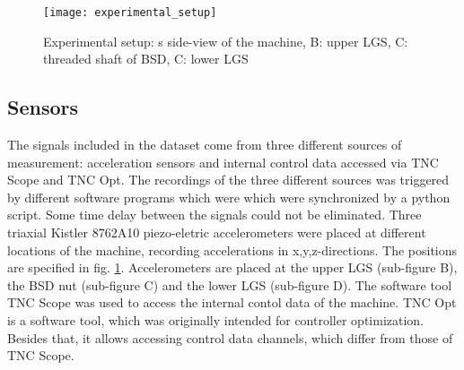 \begin{figure}[H]
  \centering
  \texttt{[image: experimental\_setup]}
  \caption {Experimental setup: s side-view of the machine, B: upper LGS, C: threaded shaft of BSD, C: lower LGS}
  \label{fig:experimental_setup}
\end{figure}

\subsection{Sensors}
The signals included in the dataset come from three different sources of measurement: acceleration sensors and internal control data accessed via TNC Scope and TNC Opt. The recordings of the three different sources was triggered by different software programs which were which were synchronized by a python script. Some time delay between the signals could not be eliminated. Three triaxial Kistler 8762A10 piezo-eletric accelerometers were placed at different locations of the machine, recording accelerations in x,y,z-directions. The positions are specified in fig. \ref{fig:experimental_setup}. Accelerometers are placed at the upper LGS (sub-figure B), the BSD nut (sub-figure C) and the lower LGS (sub-figure D). The software tool TNC Scope was used to access the internal contol data of the machine. TNC Opt is a software tool, which was originally intended for controller optimization. Besides that, it allows accessing control data channels, which differ from those of TNC Scope.

